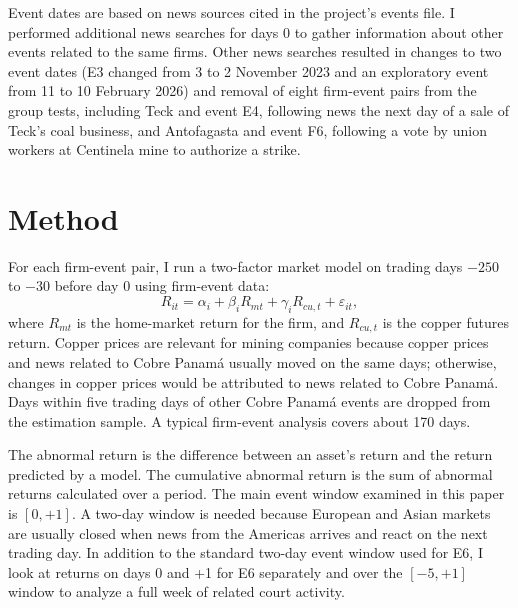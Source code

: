 \documentclass[11pt]{article}
\begin{document}
Event dates are based on news sources cited in the project's events file. I performed additional news searches for days 0 to gather information about other events related to the same firms. Other news searches resulted in changes to two event dates (E3 changed from 3 to 2 November 2023 and an exploratory event from 11 to 10 February 2026) and removal of eight firm-event pairs from the group tests, including Teck and event E4, following news the next day of a sale of Teck's coal business, and Antofagasta and event F6, following a vote by union workers at Centinela mine to authorize a strike.

\section{Method}

For each firm-event pair, I run a two-factor market model on trading days $-250$ to $-30$ before day 0 using firm-event data:
\begin{equation}
R_{it} = \alpha_i + \beta_i R_{mt} + \gamma_i R_{cu,t} + \varepsilon_{it},
\end{equation}
where $R_{mt}$ is the home-market return for the firm, and $R_{cu,t}$ is the copper futures return. Copper prices are relevant for mining companies because copper prices and news related to Cobre Panamá usually moved on the same days; otherwise, changes in copper prices would be attributed to news related to Cobre Panamá. Days within five trading days of other Cobre Panamá events are dropped from the estimation sample. A typical firm-event analysis covers about 170 days.

The abnormal return is the difference between an asset's return and the return predicted by a model. The cumulative abnormal return is the sum of abnormal returns calculated over a period. The main event window examined in this paper is $[0, +1]$. A two-day window is needed because European and Asian markets are usually closed when news from the Americas arrives and react on the next trading day. In addition to the standard two-day event window used for E6, I look at returns on days 0 and +1 for E6 separately and over the $[-5, +1]$ window to analyze a full week of related court activity.
\end{document}
